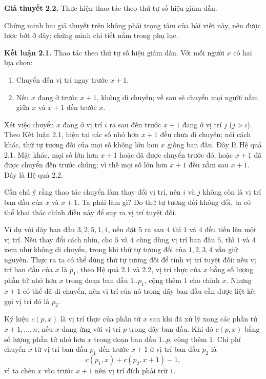 \documentclass[11pt]{article}
\begin{document}
\noindent\textbf{Giả thuyết 2.2.} Thực hiện thao tác theo thứ tự số hiệu giảm
dần.

Chứng minh hai giả thuyết trên không phải trọng tâm của bài viết này, nên được
lược bớt ở đây; chứng minh chi tiết nằm trong phụ lục.

\noindent\textbf{Kết luận 2.1.} Thao tác theo thứ tự số hiệu giảm dần. Với mỗi
người $x$ có hai lựa chọn:
\begin{enumerate}
  \item Chuyển đến vị trí ngay trước $x+1$.
  \item Nếu $x$ đang ở trước $x+1$, không di chuyển; về sau sẽ chuyển mọi
  người nằm giữa $x$ và $x+1$ đến trước $x$.
\end{enumerate}

Xét việc chuyển $x$ đang ở vị trí $i$ ra sau đến trước $x+1$ đang ở vị trí
$j$ ($j>i$). Theo Kết luận 2.1, hiện tại các số nhỏ hơn $x+1$ đều chưa di
chuyển; nói cách khác, thứ tự tương đối của mọi số không lớn hơn $x$ giống
ban đầu. Đây là Hệ quả 2.1. Mặt khác, mọi số lớn hơn $x+1$ hoặc đã được
chuyển trước đó, hoặc $x+1$ đã được chuyển đến trước chúng; vì thế mọi số lớn
hơn $x+1$ đều nằm sau $x+1$. Đây là Hệ quả 2.2.

Cần chú ý rằng thao tác chuyển làm thay đổi vị trí, nên $i$ và $j$ không còn
là vị trí ban đầu của $x$ và $x+1$. Ta phải làm gì? Do thứ tự tương đối không
đổi, ta có thể khai thác chính điều này để suy ra vị trí tuyệt đối.

Ví dụ với dãy ban đầu $3,2,5,1,4$, nếu đặt $5$ ra sau $4$ thì $1$ và $4$ đều
tiến lên một vị trí. Nếu thay đổi cách nhìn, cho $5$ và $4$ cùng dùng vị trí
ban đầu $5$, thì $1$ và $4$ xem như không di chuyển, trong khi thứ tự tương
đối của $1,2,3,4$ vẫn giữ nguyên. Thực ra ta có thể dùng thứ tự tương đối để
tính vị trí tuyệt đối: nếu vị trí ban đầu của $x$ là $p_1$, theo Hệ quả 2.1
và 2.2, vị trí thực của $x$ bằng số lượng phần tử nhỏ hơn $x$ trong đoạn ban
đầu $1..p_1$, cộng thêm $1$ cho chính $x$. Nhưng $x+1$ có thể đã di chuyển,
nên vị trí của nó trong dãy ban đầu cần được liệt kê; gọi vị trí đó là $p_2$.

Ký hiệu $c(p,x)$ là vị trí thực của phần tử $x$ sau khi đã xử lý xong các phần
tử $x+1,\ldots,n$, nếu $x$ đang ứng với vị trí $p$ trong dãy ban đầu. Khi đó
$c(p,x)$ bằng số lượng phần tử nhỏ hơn $x$ trong đoạn ban đầu $1..p$, cộng
thêm $1$. Chi phí chuyển $x$ từ vị trí ban đầu $p_1$ đến trước $x+1$ ở vị trí
ban đầu $p_2$ là
\[
  c(p_1,x)+c(p_2,x+1)-1,
\]
vì ta chèn $x$ vào trước $x+1$ nên vị trí đích phải trừ $1$.
\end{document}
